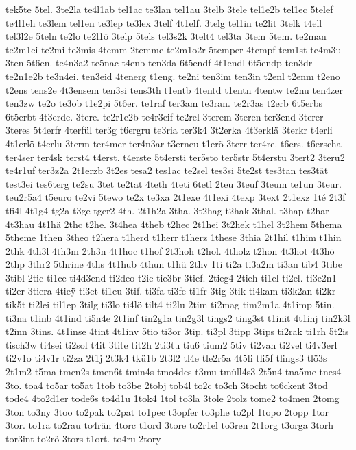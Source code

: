 {tek5te
5tel.
3te2la
te4l1ab
tel1ac
te3lan
tel1au
3telb
3tele
tel1e2b
tel1ec
5telef
te4l1eh
te3lem
tel1en
te3lep
te3lex
3telf
4t1elf.
3telg
tel1in
te2lit
3telk
t4ell
tel3l2e
5teln
te2lo
te2l1ö
3telp
5tels
tel3s2k
3telt4
tel3ta
3tem
5tem.
te2man
te2m1ei
te2mi
te3mis
4temm
2temme
te2m1o2r
5temper
4tempf
tem1st
te4m3u
3ten
5t6en.
te4n3a2
te5nac
t4enb
ten3da
6t5endf
4t1endl
6t5endp
ten3dr
te2n1e2b
te3n4ei.
ten3eid
4tenerg
t1eng.
te2ni
ten3im
ten3in
t2enl
t2enm
t2eno
t2ens
tens2e
4t3ensem
ten3si
tens3th
t1entb
4tentd
t1entn
4tentw
te2nu
ten4zer
ten3zw
te2o
te3ob
t1e2pi
5t6er.
te1raf
ter3am
te3ran.
te2r3as
t2erb
6t5erbs
6t5erbt
4t3erde.
3tere.
te2r1e2b
te4r3eif
te2rel
3terem
3teren
ter3end
3terer
3teres
5t4erfr
4terfül
ter3g
t6ergru
te3ria
ter3k4
3t2erka
4t3erklä
3terkr
t4erli
4t1erlö
t4erlu
3term
ter4mer
ter4n3ar
t3erneu
t1erö
3terr
ter4re.
t6ers.
t6erscha
ter4ser
ter4sk
terst4
t4erst.
t4erste
5t4ersti
ter5sto
ter5str
5t4erstu
3tert2
3teru2
te4r1uf
ter3z2a
2t1erzb
3t2es
tesa2
tes1ac
te2sel
tes3si
5te2st
tes3tan
tes3tät
test3ei
tes6terg
te2su
3tet
te2tat
4teth
4teti
6tetl
2teu
3teuf
3teum
te1un
3teur.
teu2r5a4
t5euro
te2vi
5tewo
te2x
te3xa
2t1exe
4t1exi
4texp
3text
2t1exz
1té
2t3f
tfi4l
4t1g4
tg2a
t3ge
tger2
4th.
2t1h2a
3tha.
3t2hag
t2hak
3thal.
t3hap
t2har
4t3hau
4t1hä
2thc
t2he.
3t4hea
4theb
t2hec
2t1hei
3t2hek
t1hel
3t2hem
5thema
5theme
1then
3theo
t2hera
t1herd
t1herr
t1herz
1these
3thia
2t1hil
t1him
t1hin
2thk
4th3l
4th3m
2th3n
4t1hoc
t1hof
2t3hoh
t2hol.
4tholz
t2hon
4t3hot
4t3hö
2thp
3thr2
5thrine
4ths
4t1hub
4thun
t1hü
2thv
1ti
ti2a
ti3a2m
ti3an
tib4
3tibe
3tibl
2tic
ti1ce
ti4d3end
ti2deo
t2ie
tie3br
3tief.
2tieg4
2tieh
ti1el
ti2el.
ti3e2n1
ti2er
3tiera
4tie^^ff
ti3et
ti1eu
3tif.
ti3fa
ti3fe
ti1fr
3tig
3tik
ti4kam
ti3k2an
ti2kr
tik5t
ti2lei
til1ep
3tilg
ti3lo
ti4lö
tilt4
ti2lu
2tim
ti2mag
tim2m1a
4t1imp
5tin.
ti3na
t1inb
4t1ind
ti5n4e
2t1inf
tin2g1a
tin2g3l
tings2
ting3st
t1init
4t1inj
tin2k3l
t2inn
3tins.
4t1inse
4tint
4t1inv
5tio
ti3or
3tip.
ti3pl
3tipp
3tips
ti2rak
ti1rh
5t2is
tisch3w
ti4sei
ti2sol
t4it
3tite
tit2h
2ti3tu
tiu6
tium2
5tiv
ti2van
ti2vel
ti4v3erl
ti2v1o
ti4v1r
ti2za
2t1j
2t3k4
tkü1b
2t3l2
tl4e
tle2r5a
4t5li
tli5f
tlings3
tlö3s
2t1m2
t5ma
tmen2s
tmen6t
tmin4s
tmo4des
t3mu
tmüll4s3
2t5n4
tna5me
tnes4
3to.
toa4
to5ar
to5at
1tob
to3be
2tobj
tob4l
to2c
to3ch
3tocht
to6ckent
3tod
tode4
4to2d1er
tode6s
to4d1u
1tok4
1tol
to3la
3tole
2tolz
tome2
to4men
2tomg
3ton
to3ny
3too
to2pak
to2pat
to1pec
t3opfer
to3phe
to2pl
1topo
2topp
1tor
3tor.
to1ra
to2rau
to4rän
4torc
t1ord
3tore
to2r1el
to3ren
2t1org
t3orga
3torh
tor3int
to2rö
3tors
t1ort.
to4ru
2tory
}

